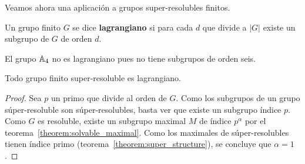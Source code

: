 Veamos ahora una aplicación a grupos super-resolubles finitos.

\begin{definition}
	Un grupo finito $G$ se dice \textbf{lagrangiano} si para cada $d$ que
	divide a $|G|$ existe un subgrupo de $G$ de orden $d$.
\end{definition}

El grupo $\mathbb{A}_4$ no es lagrangiano pues no tiene subgrupos de orden seis.

\begin{theorem}
	Todo grupo finito super-resoluble es lagrangiano. 
\end{theorem}

\begin{proof}
	Sea $p$ un primo que divide al orden de $G$.  Como los subgrupos de un
	grupo súper-resoluble son súper-resolubles, basta ver que existe un subgrupo
	índice $p$. Como $G$ es resoluble, existe un subgrupo maximal $M$ de índice
	$p^{\alpha}$ por el teorema~\ref{theorem:solvable_maximal}. Como los
	maximales de súper-resolubles tienen índice primo
	(teorema~\ref{theorem:super_structure}), se concluye que $\alpha=1$.
\end{proof}
